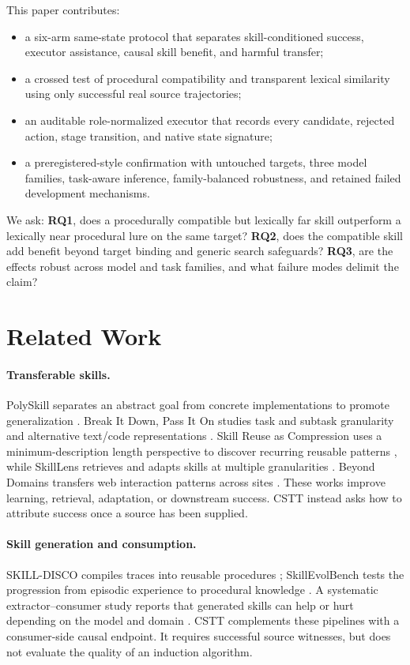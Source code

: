 \documentclass[10pt]{article}
\begin{document}
This paper contributes:
\begin{itemize}
  \item a six-arm same-state protocol that separates skill-conditioned success,
  executor assistance, causal skill benefit, and harmful transfer;
  \item a crossed test of procedural compatibility and transparent lexical
  similarity using only successful real source trajectories;
  \item an auditable role-normalized executor that records every candidate,
  rejected action, stage transition, and native state signature;
  \item a preregistered-style confirmation with untouched targets, three model
  families, task-aware inference, family-balanced robustness, and retained
  failed development mechanisms.
\end{itemize}

We ask: \textbf{RQ1}, does a procedurally compatible but lexically far skill
outperform a lexically near procedural lure on the same target? \textbf{RQ2},
does the compatible skill add benefit beyond target binding and generic search
safeguards? \textbf{RQ3}, are the effects robust across model and task families,
and what failure modes delimit the claim?

\section{Related Work}
\paragraph{Transferable skills.}
PolySkill separates an abstract goal from concrete implementations to promote
generalization \citep{yu2026polyskill}. Break It Down, Pass It On studies task and
subtask granularity and alternative text/code representations
\citep{feng2026breakdown}. Skill Reuse as Compression uses a minimum-description
length perspective to discover recurring reusable patterns
\citep{xu2026compression}, while SkillLens retrieves and adapts skills at
multiple granularities \citep{miao2026skilllens}. Beyond Domains transfers web
interaction patterns across sites \citep{he2026beyond}. These works improve
learning, retrieval, adaptation, or downstream success. CSTT instead asks how
to attribute success once a source has been supplied.

\paragraph{Skill generation and consumption.}
SKILL-DISCO compiles traces into reusable procedures
\citep{guo2026skilldisco}; SkillEvolBench tests the progression from episodic
experience to procedural knowledge \citep{lei2026skillevolbench}. A systematic
extractor--consumer study reports that generated skills can help or hurt
depending on the model and domain \citep{huang2026consumption}. CSTT complements
these pipelines with a consumer-side causal endpoint. It requires successful
source witnesses, but does not evaluate the quality of an induction algorithm.
\end{document}
